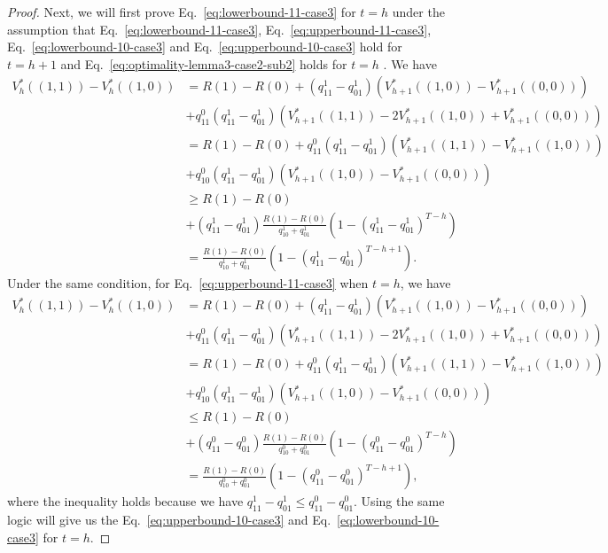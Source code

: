 \begin{proof}
Next, we will first prove Eq.~\eqref{eq:lowerbound-11-case3} for $t=h$ under the assumption that Eq.~\eqref{eq:lowerbound-11-case3}, Eq.~\eqref{eq:upperbound-11-case3}, Eq.~\eqref{eq:lowerbound-10-case3} and Eq.~\eqref{eq:upperbound-10-case3} hold for $t=h+1$ and Eq.~\eqref{eq:optimality-lemma3-case2-sub2} holds for $t=h$ . We have
\begin{align*}
    V_{h}^*\left((1,1)\right)-V_h^*\left((1,0)\right)&=R(1)-R(0)+\left(q^1_{11}-q^1_{01}\right)\left(V_{h+1}^*\left((1,0)\right)-V_{h+1}^*\left((0,0)\right)\right)\\
    &+q^0_{11}\left(q^1_{11}-q^1_{01}\right)\left(V_{h+1}^*\left((1,1)\right)-2V_{h+1}^*\left((1,0)\right)+V_{h+1}^*\left((0,0)\right)\right)\\
    &= R(1)-R(0)+q^0_{11}\left(q^1_{11}-q^1_{01}\right)\left(V_{h+1}^*\left((1,1)\right)-V_{h+1}^*\left((1,0)\right)\right)\\&+q^0_{10}\left(q^1_{11}-q^1_{01}\right)\left(V_{h+1}^*\left((1,0)\right)-V_{h+1}^*\left((0,0)\right)\right)\\
    &\geq R(1)-R(0)\\&+\left(q^1_{11}-q^1_{01}\right)\frac{R(1)-R(0)}{q^1_{10}+q^1_{01}}\left(1-\left(q^1_{11}-q^1_{01}\right)^{T-h}\right)\\
    &=\frac{R(1)-R(0)}{q^1_{10}+q^1_{01}}\left(1-\left(q^1_{11}-q^1_{01}\right)^{T-h+1}\right).
\end{align*}
Under the same condition, for Eq.~\eqref{eq:upperbound-11-case3} when $t=h$, we have
\begin{align*}
    V_{h}^*\left((1,1)\right)-V_h^*\left((1,0)\right)&=R(1)-R(0)+\left(q^1_{11}-q^1_{01}\right)\left(V_{h+1}^*\left((1,0)\right)-V_{h+1}^*\left((0,0)\right)\right)\\
    &+q^0_{11}\left(q^1_{11}-q^1_{01}\right)\left(V_{h+1}^*\left((1,1)\right)-2V_{h+1}^*\left((1,0)\right)+V_{h+1}^*\left((0,0)\right)\right)\\
    &= R(1)-R(0)+q^0_{11}\left(q^1_{11}-q^1_{01}\right)\left(V_{h+1}^*\left((1,1)\right)-V_{h+1}^*\left((1,0)\right)\right)\\&+q^0_{10}\left(q^1_{11}-q^1_{01}\right)\left(V_{h+1}^*\left((1,0)\right)-V_{h+1}^*\left((0,0)\right)\right)\\
    &\leq R(1)-R(0)\\&+\left(q^0_{11}-q^0_{01}\right)\frac{R(1)-R(0)}{q^0_{10}+q^0_{01}}\left(1-\left(q^0_{11}-q^0_{01}\right)^{T-h}\right)\\
    &=\frac{R(1)-R(0)}{q^0_{10}+q^0_{01}}\left(1-\left(q^0_{11}-q^0_{01}\right)^{T-h+1}\right),
\end{align*}
where the inequality holds because we have $q^1_{11}-q^1_{01}\leq q^0_{11}-q^0_{01}$. Using the same logic will give us the Eq.~\eqref{eq:upperbound-10-case3} and Eq.~\eqref{eq:lowerbound-10-case3} for $t=h$.


\end{proof}
